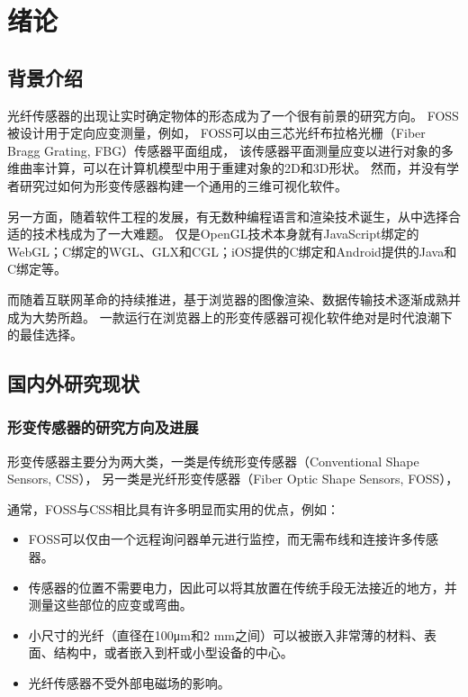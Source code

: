 \cleardoublepage

\section{绪论}

\subsection{背景介绍}

光纤传感器的出现让实时确定物体的形态成为了一个很有前景的研究方向\cite{recent-dev-in-foss}。
FOSS被设计用于定向应变测量，例如，
FOSS可以由三芯光纤布拉格光栅（Fiber Bragg Grating, FBG）传感器平面组成，
该传感器平面测量应变以进行对象的多维曲率计算，可以在计算机模型中用于重建对象的2D和3D形状。
然而，并没有学者研究过如何为形变传感器构建一个通用的三维可视化软件。

另一方面，随着软件工程的发展，有无数种编程语言和渲染技术诞生，从中选择合适的技术栈成为了一大难题。
仅是OpenGL技术本身就有JavaScript绑定的WebGL；C绑定的WGL、GLX和CGL；iOS提供的C绑定和Android提供的Java和C绑定等。

而随着互联网革命的持续推进，基于浏览器的图像渲染、数据传输技术逐渐成熟并成为大势所趋。
一款运行在浏览器上的形变传感器可视化软件绝对是时代浪潮下的最佳选择。

\subsection{国内外研究现状}

\subsubsection{形变传感器的研究方向及进展}

形变传感器主要分为两大类，一类是传统形变传感器（Conventional Shape Sensors, CSS），
另一类是光纤形变传感器（Fiber Optic Shape Sensors, FOSS）， 

通常，FOSS与CSS相比具有许多明显而实用的优点，例如：

\begin{itemize}
\item FOSS可以仅由一个远程询问器单元进行监控，而无需布线和连接许多传感器。
\item 传感器的位置不需要电力，因此可以将其放置在传统手段无法接近的地方，并测量这些部位的应变或弯曲。
\item 小尺寸的光纤（直径在100μm和2 mm之间）可以被嵌入非常薄的材料、表面、结构中，或者嵌入到杆或小型设备的中心。
\item 光纤传感器不受外部电磁场的影响。
\end{itemize}

